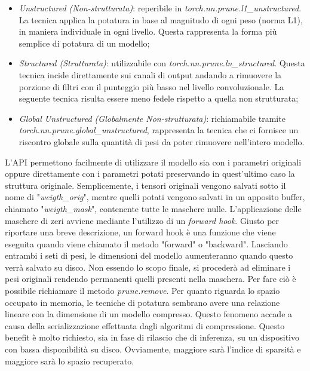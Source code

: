 \begin{itemize}
    \item \emph{Unstructured (Non-strutturata)}: reperibile in \emph{torch.nn.prune.l1\_unstructured}. La tecnica applica la potatura in base al magnitudo di ogni peso (norma L1), in maniera individuale in ogni livello. Questa rappresenta la forma più semplice di potatura di un modello;
    \item \emph{Structured (Strutturata)}:  utilizzabile con \emph{torch.nn.prune.ln\_structured}. Questa tecnica incide direttamente sui canali di output andando a rimuovere la porzione di filtri con il punteggio più basso nel livello convoluzionale. La seguente tecnica risulta essere meno fedele rispetto a quella non strutturata;
    \item \emph{Global Unstructured (Globalmente Non-strutturata)}: richiamabile tramite \emph{torch.nn.prune.global\_unstructured}, rappresenta la tecnica che ci fornisce un riscontro globale sulla quantità di pesi da poter rimuovere nell'intero modello.
\end{itemize}
L'API permettono facilmente di utilizzare il modello sia con i parametri originali oppure direttamente con i parametri potati preservando in quest'ultimo caso la struttura originale. Semplicemente, i tensori originali vengono salvati sotto il nome di "\emph{weigth\_orig}", mentre quelli potati vengono salvati in un apposito buffer, chiamato "\emph{weigth\_mask}", contenente tutte le maschere nulle. L'applicazione delle maschere di zeri avviene mediante l'utilizzo di un \emph{forward hook}. Giusto per riportare una breve descrizione, un forward hook è una funzione che viene eseguita quando viene chiamato il metodo "forward" o "backward". Lasciando entrambi i seti di pesi, le dimensioni del modello aumenteranno quando questo verrà salvato su disco. Non essendo lo scopo finale, si procederà ad eliminare i pesi originali rendendo permanenti quelli presenti nella maschera. Per fare ciò è possibile richiamare il metodo \emph{prune.remove}. 
Per quanto riguarda lo spazio occupato in memoria, le tecniche di potatura sembrano avere una relazione lineare con la dimensione di un modello compresso. Questo fenomeno accade a causa della serializzazione effettuata dagli algoritmi di compressione.
Questo benefit è molto richiesto, sia in fase di rilascio che di inferenza, su un dispositivo con bassa disponibilità su disco. Ovviamente, maggiore sarà l'indice di sparsità e maggiore sarà lo spazio recuperato. 

